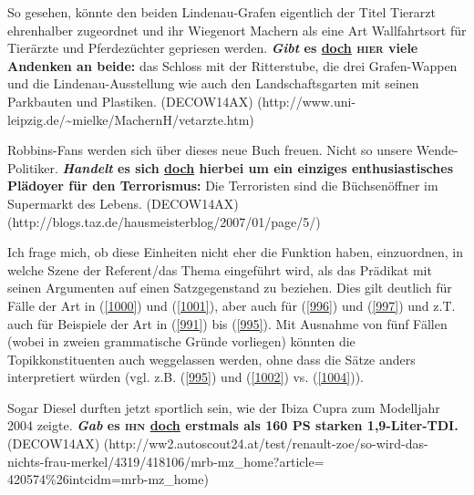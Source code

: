 {\begin{exe}
	\ex\label{1000} 
	\scriptsize
	So gesehen, könnte den beiden Lindenau-Grafen eigentlich der Titel \glqq Tierarzt ehrenhalber\grqq{} zugeordnet und ihr Wiegenort Machern als eine Art 		\glqq Wallfahrtsort\grqq{} für Tierärzte und Pferdezüchter gepriesen werden. \textbf{\textit{Gibt} es \underline{doch} \textsc{hier} viele Andenken an 		beide:} das Schloss mit der Ritterstube, die drei Grafen-Wappen und die Lindenau-Ausstellung wie auch den Landschaftsgarten mit seinen Parkbauten und 		Plastiken. 		
	\hfill\hbox {(DECOW14AX)}
	\newline
	\hbox{}\hfill\hbox{(http://www.uni-leipzig.de/\~{}mielke/MachernH/vetarzte.htm)}
\end{exe}

\begin{exe}
	\ex\label{1001} 
	\scriptsize
	Robbins-Fans werden sich über dieses neue Buch freuen. Nicht so unsere Wende-Politiker. \textbf{\textit{Handelt} es sich \underline{doch} hierbei um ein einziges 				enthusiastisches Plädoyer für den Terrorismus:} \glqq Die Terroristen sind die Büchsenöffner im Supermarkt des Lebens\grqq{}.		
	\hfill\hbox {(DECOW14AX)}
	\newline
	\hbox{}\hfill\hbox{(http://blogs.taz.de/hausmeisterblog/2007/01/page/5/)}
\end{exe}
Ich frage mich, ob diese Einheiten nicht eher die Funktion haben, einzuordnen, in welche Szene der Referent/das Thema eingeführt wird, als das Prädikat mit seinen Argumenten auf einen Satzgegenstand zu beziehen. Dies gilt deutlich für Fälle der Art in (\ref{1000}) und (\ref{1001}), aber auch für (\ref{996}) und (\ref{997}) und z.T. auch für Beispiele der Art in  (\ref{991}) bis (\ref{995}). Mit Ausnahme von fünf Fällen (wobei in zweien grammatische Gründe vorliegen) könnten die \glq Topikkonstituenten\grq {} auch weggelassen werden, ohne dass die Sätze anders interpretiert würden (vgl. z.B. (\ref{995}) und (\ref{1002}) vs. (\ref{1004})).

\begin{exe}
	\ex\label{1002} 
	\scriptsize
	Sogar Diesel durften jetzt sportlich sein, wie der Ibiza Cupra zum Modelljahr 2004 	zeigte. \textbf{\textit{Gab} es \textsc{ihn} \underline{doch} 			erstmals als 160 PS starken 1,9-Liter-TDI.} 		
	\hfill\hbox {(DECOW14AX)}
	\newline
	\hbox{}\hfill\hbox{(http://ww2.autoscout24.at/test/renault-zoe/so-wird-das-}
	\newline
	\hbox{}\hfill\hbox{nichts-frau-merkel/4319/418106/mrb-mz\_home?article=}
	\newline
	\hbox{}\hfill\hbox{420574\%26intcidm=mrb-mz\_home)}	
\end{exe}	
 		 						                            
}
